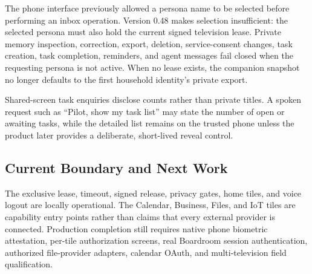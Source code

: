 The phone interface previously allowed a persona name to be selected before
performing an inbox operation.  Version 0.48 makes selection insufficient:
the selected persona must also hold the current signed television lease.
Private memory inspection, correction, export, deletion, service-consent
changes, task creation, task completion, reminders, and agent messages fail
closed when the requesting persona is not active.  When no lease exists, the
companion snapshot no longer defaults to the first household identity's
private export.

Shared-screen task enquiries disclose counts rather than private titles.  A
spoken request such as ``Pilot, show my task list'' may state the number of open
or awaiting tasks, while the detailed list remains on the trusted phone unless
the product later provides a deliberate, short-lived reveal control.

\subsection{Current Boundary and Next Work}

The exclusive lease, timeout, signed release, privacy gates, home tiles, and
voice logout are locally operational.  The Calendar, Business, Files, and IoT
tiles are capability entry points rather than claims that every external
provider is connected.  Production completion still requires native phone
biometric attestation, per-tile authorization screens, real Boardroom session
authentication, authorized file-provider adapters, calendar OAuth, and
multi-television field qualification.

